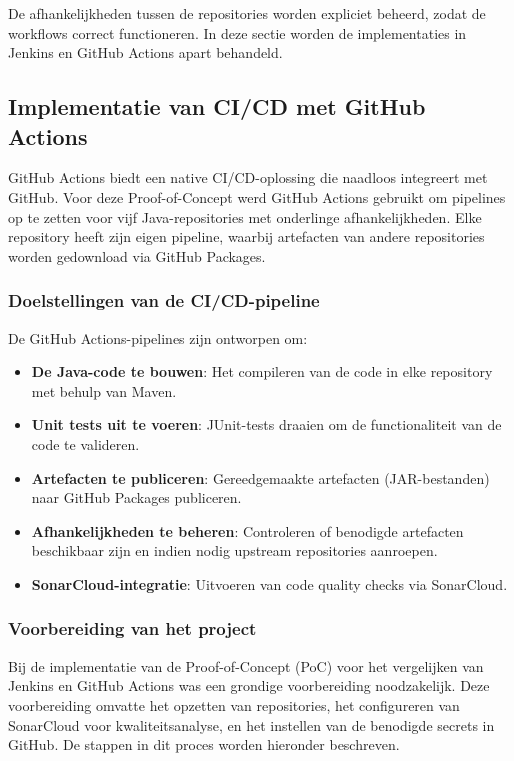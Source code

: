 De afhankelijkheden tussen de repositories worden expliciet beheerd, zodat de workflows correct functioneren. In deze sectie worden de implementaties in Jenkins en GitHub Actions apart behandeld.

\subsection{Implementatie van CI/CD met GitHub Actions}

GitHub Actions biedt een native CI/CD-oplossing die naadloos integreert met GitHub. Voor deze Proof-of-Concept werd GitHub Actions gebruikt om pipelines op te zetten voor vijf Java-repositories met onderlinge afhankelijkheden. Elke repository heeft zijn eigen pipeline, waarbij artefacten van andere repositories worden gedownload via GitHub Packages. 

\subsubsection{Doelstellingen van de CI/CD-pipeline}
De GitHub Actions-pipelines zijn ontworpen om:
\begin{itemize}
    \item \textbf{De Java-code te bouwen}: Het compileren van de code in elke repository met behulp van Maven.
    \item \textbf{Unit tests uit te voeren}: JUnit-tests draaien om de functionaliteit van de code te valideren.
    \item \textbf{Artefacten te publiceren}: Gereedgemaakte artefacten (JAR-bestanden) naar GitHub Packages publiceren.
    \item \textbf{Afhankelijkheden te beheren}: Controleren of benodigde artefacten beschikbaar zijn en indien nodig upstream repositories aanroepen.
    \item \textbf{SonarCloud-integratie}: Uitvoeren van code quality checks via SonarCloud.
\end{itemize}

\subsubsection{Voorbereiding van het project} \label{subsec:voorbereidingvanhetproject}

Bij de implementatie van de Proof-of-Concept (PoC) voor het vergelijken van Jenkins en GitHub Actions was een grondige voorbereiding noodzakelijk. Deze voorbereiding omvatte het opzetten van repositories, het configureren van SonarCloud voor kwaliteitsanalyse, en het instellen van de benodigde secrets in GitHub. De stappen in dit proces worden hieronder beschreven.

